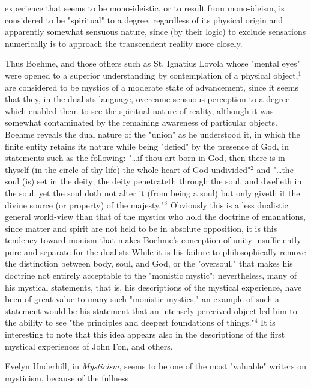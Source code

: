 \noindent experience that seems to be mono-ideistic,
or to result from mono-ideism, is considered to be
"spiritual" to a degree, regardless of its physical origin
and apparently somewhat sensuous nature, since (by their
logic) to exclude sensations numerically is to approach
the transcendent reality more closely.\par
\vspace*{0.5\baselineskip}
Thus Boehme, and those others such as St. Ignatius Lovola
whose "mental eyes" were opened to a superior understanding
by contemplation of a physical object,$^{1}$ are considered to be
mystics of a moderate state of advancement, since it seems that
they, in the dualists language, overcame sensuous perception
to a degree which enabled them to see the spiritual nature of
reality, although it was somewhat contaminated by the remaining
awareness of particular objects. Boehme reveals the dual
nature of the "union" as he understood it, in which the
finite entity retains its nature while being "defied" by the
presence of God, in statements such as the following:
"\dots if thou art born in God, then there is in thyself (in the
circle of thy life) the whole heart of God undivided"$^{2}$ and
"\dots the soul (is) set in the deity; the deity penetrateth
through the soul, and dwelleth in the soul, yet the soul doth
not alter it (from being a soul) but only giveth it the
divine source (or property) of the majesty."$^{3}$ Obviously
this is a less dualistic general world-view than that of the
mystics who hold the doctrine of emanations, since matter
and spirit are not held to be in absolute opposition, it is
this tendency toward monism that makes Boehme's conception of
unity insufficiently pure and separate for the dualists
While it is his failure to philosophically remove the distinction
between body, soul, and God, or the "oversoul," that
makes his doctrine not entirely acceptable to the "monistic
mystic"; nevertheless, many of his mystical statements,
that is, his descriptions of the mystical experience, have
been of great value to many such "monistic mystics," an
example of such a statement would be his statement that an
intensely perceived object led him to the ability to see
"the principles and deepest foundations of things."$^{4}$ It is
interesting to note that this idea appears also in the descriptions
of the first mystical experiences of John Fon,
and others.\par
\vspace*{0.5\baselineskip}
Evelyn Underhill, in \textit{Mysticism}, seems to be one of the
most "valuable" writers on mysticism, because of the fullness
